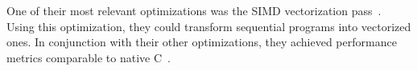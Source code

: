 \documentclass[main.tex]{subfiles}
\begin{document}
	One of their most relevant optimizations was the SIMD vectorization pass~\cite{hrc-simd}. Using this optimization, they could transform sequential programs into vectorized ones. In conjunction with their other optimizations, they achieved performance metrics comparable to native C~\cite{haskell-gap}.
	
	
	
\end{document}

